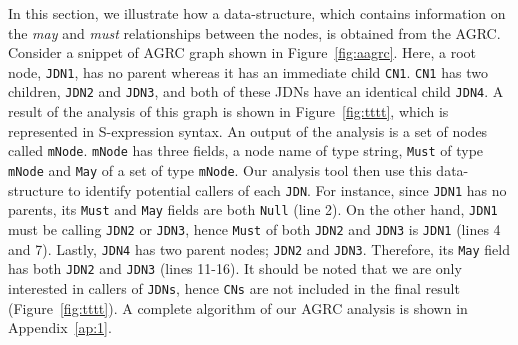In this section, we illustrate how a data-structure, which contains
information on the \textit{may} and \textit{must} relationships between
the nodes, is obtained from the AGRC. Consider a snippet of AGRC graph
shown in Figure~\ref{fig:aagrc}. Here, a root node, \texttt{JDN1}, has
no parent whereas it has an immediate child \texttt{CN1}. \texttt{CN1}
has two children, \texttt{JDN2} and \texttt{JDN3}, and both of these
JDNs have an identical child \texttt{JDN4}. A result of the analysis of
this graph is shown in Figure~\ref{fig:tttt}, which is represented in
S-expression syntax. An output of the analysis is a set of nodes called
\texttt{mNode}. \texttt{mNode} has three fields, a node name of type
string, \texttt{Must} of type \texttt{mNode} and \texttt{May} of a set
of type \texttt{mNode}. Our analysis tool then use this data-structure
to identify potential callers of each \texttt{JDN}. For instance, since
\texttt{JDN1} has no parents, its \texttt{Must} and \texttt{May} fields
are both \texttt{Null} (line 2).  On the other hand, \texttt{JDN1} must
be calling \texttt{JDN2} or \texttt{JDN3}, hence \texttt{Must} of both
\texttt{JDN2} and \texttt{JDN3} is \texttt{JDN1} (lines 4 and 7).
Lastly, \texttt{JDN4} has two parent nodes; \texttt{JDN2} and
\texttt{JDN3}. Therefore, its \texttt{May} field has both \texttt{JDN2}
and \texttt{JDN3} (lines 11-16). It should be noted that we are only
interested in callers of \texttt{JDNs}, hence \texttt{CNs} are not
included in the final result (Figure~\ref{fig:tttt}). A complete
algorithm of our AGRC analysis is shown in Appendix~\ref{ap:1}.






